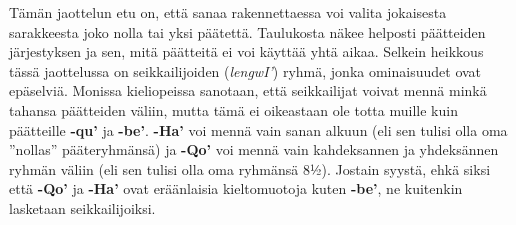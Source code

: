 \documentclass{book}
\begin{document}
Tämän jaottelun etu on, että sanaa rakennettaessa voi valita jokaisesta sarakkeesta joko nolla tai yksi päätettä. Taulukosta näkee helposti päätteiden järjestyksen ja sen, mitä päätteitä ei voi käyttää yhtä aikaa. Selkein heikkous tässä jaottelussa on seikkailijoiden (\textit{lengwI'}) ryhmä, jonka ominaisuudet ovat epäselviä. Monissa kieliopeissa sanotaan, että seikkailijat voivat mennä minkä tahansa päätteiden väliin, mutta tämä ei oikeastaan ole totta muille kuin päätteille \textbf{-qu'} ja \textbf{-be'}. \textbf{-Ha'} voi mennä vain sanan alkuun (eli sen tulisi olla oma ''nollas'' pääteryhmänsä) ja \textbf{-Qo'} voi mennä vain kahdeksannen ja yhdeksännen ryhmän väliin (eli sen tulisi olla oma ryhmänsä 8½). Jostain syystä, ehkä siksi että \textbf{-Qo'} ja \textbf{-Ha'} ovat eräänlaisia kieltomuotoja kuten \textbf{-be'}, ne kuitenkin lasketaan seikkailijoiksi.

\backmatter
\clearpage
\ifxetex
{}
\fi
\printindex[sanat]
\printindex
\end{document}

